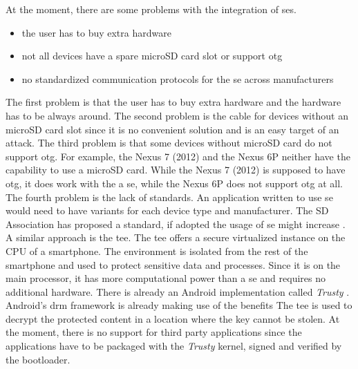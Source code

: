 \newline
At the moment, there are some problems with the integration of \gls{se}s.
\begin{itemize}
  \item the user has to buy extra hardware
  \item not all devices have a spare microSD card slot or support \gls{otg}
  \item no standardized communication protocols for the \gls{se} across manufacturers
\end{itemize}
The first problem is that the user has to buy extra hardware and the hardware has to be always around.
The second problem is the cable for devices without an microSD card slot since it is no convenient solution and is an easy target of an attack.
\newline
The third problem is that some devices without microSD card do not support \gls{otg}.
For example, the Nexus 7 (2012) and the Nexus 6P neither have the capability to use a microSD card.
While the Nexus 7 (2012) is supposed to have \gls{otg}, it does work with the a \gls{se}, while the Nexus 6P does not support \gls{otg} at all.
\newline
The fourth problem is the lack of standards.
An application written to use \gls{se} would need to have variants for each device type and manufacturer.
The SD Association has proposed a standard, if adopted the usage of \gls{se} might increase \cite{smartSD}.
\newline
\newline
A similar approach is the \gls{tee}.
The \gls{tee} offers a secure virtualized instance on the CPU of a smartphone.
The environment is isolated from the rest of the smartphone and used to protect sensitive data and processes.
Since it is on the main processor, it has more computational power than a \gls{se} and requires no additional hardware.
There is already an Android implementation called \textit{Trusty} \cite{trusty}.
Android’s \gls{drm} framework is already making use of the benefits
The \gls{tee} is used to decrypt the protected content in a location where the key cannot be stolen.
At the moment, there is no support for third party applications since the applications have to be packaged with the \textit{Trusty} kernel, signed and verified by the bootloader. \cite{trusty} \cite{teeGlobal}

